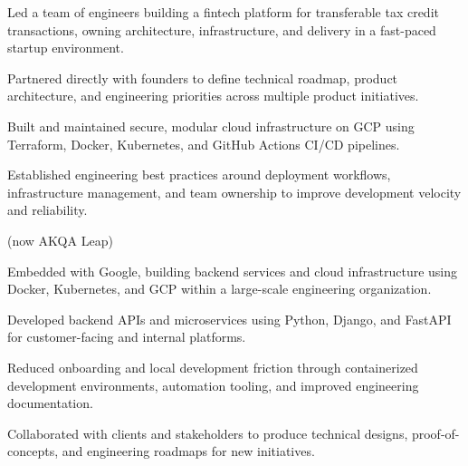 \documentclass[]{plushcv}
\begin{document}
\begin{minipage}[t]{0.70\textwidth}
\begin{tightemize}
\item Led a team of engineers building a fintech platform for transferable tax credit transactions, owning architecture, infrastructure, and delivery in a fast-paced startup environment.
\item Partnered directly with founders to define technical roadmap, product architecture, and engineering priorities across multiple product initiatives.
\item Built and maintained secure, modular cloud infrastructure on GCP using Terraform, Docker, Kubernetes, and GitHub Actions CI/CD pipelines.
\item Established engineering best practices around deployment workflows, infrastructure management, and team ownership to improve development velocity and reliability.
\end{tightemize}
\sectionsep

{\color{date}\fontspec[Path = \pathlocationfont]{\locationfont}\fontsize{7pt}{9pt}\selectfont\mdseries (now AKQA Leap)} 
\begin{tightemize}
\item Embedded with Google, building backend services and cloud infrastructure using Docker, Kubernetes, and GCP within a large-scale engineering organization.
\item Developed backend APIs and microservices using Python, Django, and FastAPI for customer-facing and internal platforms.
\item Reduced onboarding and local development friction through containerized development environments, automation tooling, and improved engineering documentation.
\item Collaborated with clients and stakeholders to produce technical designs, proof-of-concepts, and engineering roadmaps for new initiatives.
\end{tightemize}
\sectionsep


\end{minipage}
\end{document}
